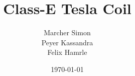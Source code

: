 \documentclass[
	fontsize=10pt, %
	twoside=false, %
	open=any, %
	numbers=noenddot, %
]{kaobook}
\begin{document}

\subject{Diploma Thesis}

\title{Class-E Tesla Coil}

\author{Marcher Simon\\Peyer Kassandra\\Felix Hamrle}

\date{\today}


\frontmatter %




\maketitle
{}





\begingroup %
\end{document}
